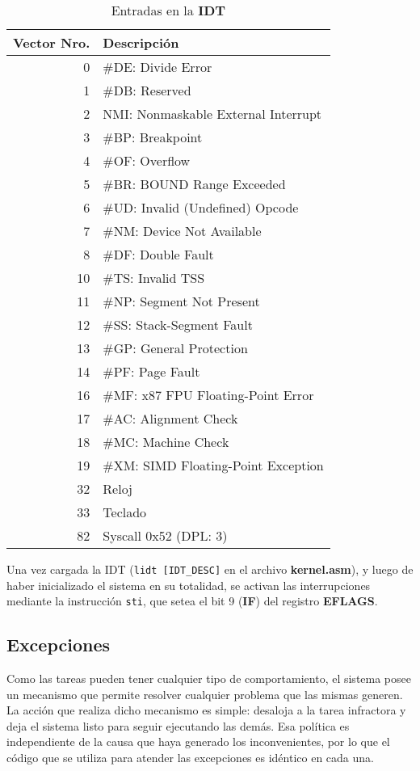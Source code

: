 \documentclass[a4paper]{article}
\begin{document}
\begin{center}
\begin{table}
\caption{Entradas en la \textbf{IDT}}
\begin{center}
\begin{tabular}{|r|l|}
\hline
Vector Nro.	& Descripción	\\ \hline
0	&	\#DE: Divide Error	\\ \hline			
1	&	\#DB: Reserved \\ \hline
2	&	NMI: Nonmaskable External Interrupt \\ \hline
3	&	\#BP: Breakpoint \\ \hline
4	&	\#OF: Overflow  \\ \hline
5	&	\#BR: BOUND Range Exceeded \\ \hline
6	&	\#UD: Invalid (Undefined) Opcode  \\ \hline
7	&	\#NM: Device Not Available  \\ \hline
8	&	\#DF: Double Fault \\ \hline
10	&	\#TS: Invalid TSS \\ \hline
11	&	\#NP: Segment Not Present \\ \hline
12	&	\#SS: Stack-Segment Fault \\ \hline
13	&	\#GP: General Protection \\ \hline
14	&	\#PF: Page Fault \\ \hline
16	&	\#MF: x87 FPU Floating-Point Error \\ \hline
17	&	\#AC: Alignment Check \\ \hline
18	&	\#MC: Machine Check \\ \hline
19	&	\#XM: SIMD Floating-Point Exception \\ \hline
32	&	Reloj	\\ \hline
33 	& 	Teclado \\ \hline
82	&	Syscall 0x52 (DPL: 3)  \\
\hline
\end{tabular}
\end{center}
\end{table}
\end{center}

Una vez cargada la IDT (\texttt{lidt [IDT_DESC]} en el archivo \textbf{kernel.asm}), y luego de haber inicializado el sistema en su totalidad, se activan las interrupciones mediante la instrucción \texttt{sti}, que setea el bit 9 (\textbf{IF}) del registro \textbf{EFLAGS}.

\subsection{Excepciones}
Como las tareas pueden tener cualquier tipo de comportamiento, el sistema posee un mecanismo que permite resolver cualquier problema que las mismas generen. La acción que realiza dicho mecanismo es simple: desaloja a la tarea infractora y deja el sistema listo para seguir ejecutando las demás. Esa política es independiente de la causa que haya generado los inconvenientes, por lo que el código que se utiliza para atender las excepciones es idéntico en cada una. 
\end{document}

